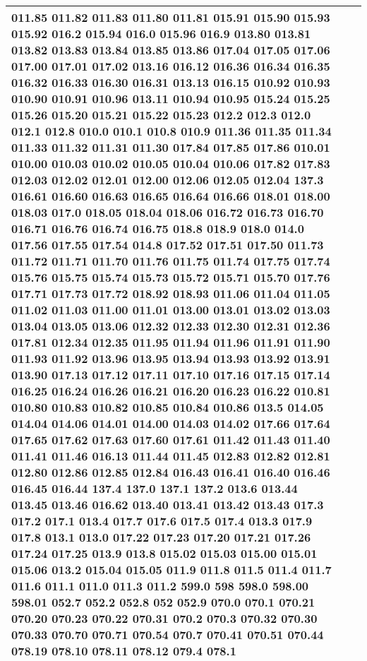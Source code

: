 \begin{longtable}{|R{.05in}|L{.5in}||L{5.75in}|}
011.85 011.82 011.83 011.80 011.81 015.91 015.90 015.93 015.92 016.2 015.94 016.0 015.96 016.9 013.80 013.81 013.82 013.83 013.84 013.85 013.86 017.04 017.05 017.06 017.00 017.01 017.02 013.16 016.12 016.36 016.34 016.35 016.32 016.33 016.30 016.31 013.13 016.15 010.92 010.93 010.90 010.91 010.96 013.11 010.94 010.95 015.24 015.25 015.26 015.20 015.21 015.22 015.23 012.2 012.3 012.0 012.1 012.8 010.0 010.1 010.8 010.9 011.36 011.35 011.34 011.33 011.32 011.31 011.30 017.84 017.85 017.86 010.01 010.00 010.03 010.02 010.05 010.04 010.06 017.82 017.83 012.03 012.02 012.01 012.00 012.06 012.05 012.04 137.3 016.61 016.60 016.63 016.65 016.64 016.66 018.01 018.00 018.03 017.0 018.05 018.04 018.06 016.72 016.73 016.70 016.71 016.76 016.74 016.75 018.8 018.9 018.0 014.0 017.56 017.55 017.54 014.8 017.52 017.51 017.50 011.73 011.72 011.71 011.70 011.76 011.75 011.74 017.75 017.74 015.76 015.75 015.74 015.73 015.72 015.71 015.70 017.76 017.71 017.73 017.72 018.92 018.93 011.06 011.04 011.05 011.02 011.03 011.00 011.01 013.00 013.01 013.02 013.03 013.04 013.05 013.06 012.32 012.33 012.30 012.31 012.36 017.81 012.34 012.35 011.95 011.94 011.96 011.91 011.90 011.93 011.92 013.96 013.95 013.94 013.93 013.92 013.91 013.90 017.13 017.12 017.11 017.10 017.16 017.15 017.14 016.25 016.24 016.26 016.21 016.20 016.23 016.22 010.81 010.80 010.83 010.82 010.85 010.84 010.86 013.5 014.05 014.04 014.06 014.01 014.00 014.03 014.02 017.66 017.64 017.65 017.62 017.63 017.60 017.61 011.42 011.43 011.40 011.41 011.46 016.13 011.44 011.45 012.83 012.82 012.81 012.80 012.86 012.85 012.84 016.43 016.41 016.40 016.46 016.45 016.44 137.4 137.0 137.1 137.2 013.6 013.44 013.45 013.46 016.62 013.40 013.41 013.42 013.43 017.3 017.2 017.1 013.4 017.7 017.6 017.5 017.4 013.3 017.9 017.8 013.1 013.0 017.22 017.23 017.20 017.21 017.26 017.24 017.25 013.9 013.8 015.02 015.03 015.00 015.01 015.06 013.2 015.04 015.05 011.9 011.8 011.5 011.4 011.7 011.6 011.1 011.0 011.3 011.2 599.0 598 598.0 598.00 598.01 052.7 052.2 052.8 052 052.9 070.0 070.1 070.21 070.20 070.23 070.22 070.31 070.2 070.3 070.32 070.30 070.33 070.70 070.71 070.54 070.7 070.41 070.51 070.44 078.19 078.10 078.11 078.12 079.4 078.1
  \\\hline

\end{longtable}
